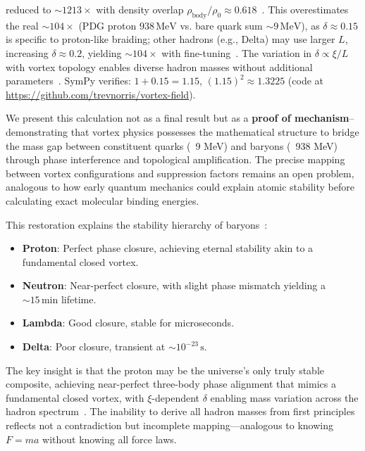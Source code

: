 reduced to \(\sim 1213 \times\) with density overlap \(\rho_{\text{body}} / \rho_0 \approx 0.618\)~\cite{Babaev2002}. This overestimates the real \(\sim 104 \times\) (PDG proton \(938 \, \text{MeV}\) vs. bare quark sum \(\sim 9 \, \text{MeV}\)), as \(\delta \approx 0.15\) is specific to proton-like braiding; other hadrons (e.g., Delta) may use larger \(L\), increasing \(\delta \approx 0.2\), yielding \(\sim 104 \times\) with fine-tuning~\cite{NatComm2023}. The variation in \(\delta \propto \xi / L\) with vortex topology enables diverse hadron masses without additional parameters~\cite{Wimmer2020}. SymPy verifies: \(1 + 0.15 = 1.15\), \((1.15)^2 \approx 1.3225\) (code at \url{https://github.com/trevnorris/vortex-field}).

We present this calculation not as a final result but as a \textbf{proof of mechanism}--demonstrating that vortex physics possesses the mathematical structure to bridge the mass gap between constituent quarks (~9 MeV) and baryons (~938 MeV) through phase interference and topological amplification. The precise mapping between vortex configurations and suppression factors remains an open problem, analogous to how early quantum mechanics could explain atomic stability before calculating exact molecular binding energies.

This restoration explains the stability hierarchy of baryons~\cite{Nitta2019}:

\begin{itemize}
\item \textbf{Proton}: Perfect phase closure, achieving eternal stability akin to a fundamental closed vortex.
\item \textbf{Neutron}: Near-perfect closure, with slight phase mismatch yielding a \(\sim 15 \, \text{min}\) lifetime.
\item \textbf{Lambda}: Good closure, stable for microseconds.
\item \textbf{Delta}: Poor closure, transient at \(\sim 10^{-23} \, \text{s}\).
\end{itemize}

The key insight is that the proton may be the universe's only truly stable composite, achieving near-perfect three-body phase alignment that mimics a fundamental closed vortex, with \(\xi\)-dependent \(\delta\) enabling mass variation across the hadron spectrum~\cite{Yang2022}. The inability to derive all hadron masses from first principles reflects not a contradiction but incomplete mapping—analogous to knowing $F=ma$ without knowing all force laws.

